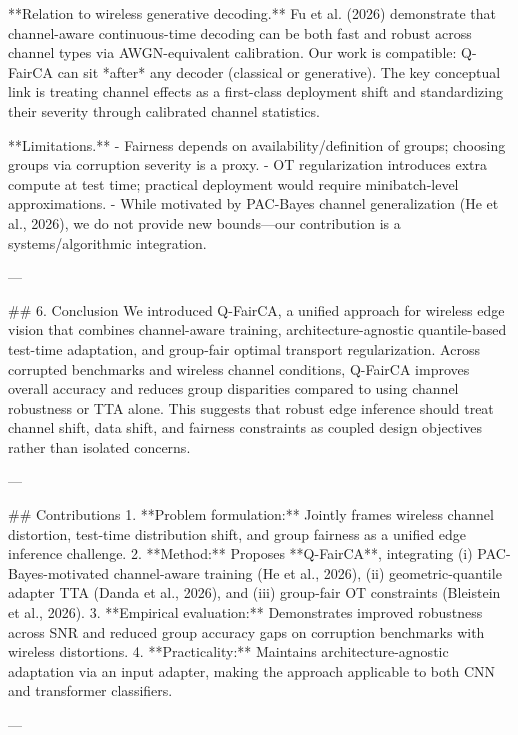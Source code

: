 **Relation to wireless generative decoding.** Fu et al. (2026) demonstrate that channel-aware continuous-time decoding can be both fast and robust across channel types via AWGN-equivalent calibration. Our work is compatible: Q-FairCA can sit *after* any decoder (classical or generative). The key conceptual link is treating channel effects as a first-class deployment shift and standardizing their severity through calibrated channel statistics.

**Limitations.**  
- Fairness depends on availability/definition of groups; choosing groups via corruption severity is a proxy.  
- OT regularization introduces extra compute at test time; practical deployment would require minibatch-level approximations.  
- While motivated by PAC-Bayes channel generalization (He et al., 2026), we do not provide new bounds—our contribution is a systems/algorithmic integration.

---

## 6. Conclusion  
We introduced Q-FairCA, a unified approach for wireless edge vision that combines channel-aware training, architecture-agnostic quantile-based test-time adaptation, and group-fair optimal transport regularization. Across corrupted benchmarks and wireless channel conditions, Q-FairCA improves overall accuracy and reduces group disparities compared to using channel robustness or TTA alone. This suggests that robust edge inference should treat channel shift, data shift, and fairness constraints as coupled design objectives rather than isolated concerns.

---

## Contributions  
1. **Problem formulation:** Jointly frames wireless channel distortion, test-time distribution shift, and group fairness as a unified edge inference challenge.  
2. **Method:** Proposes **Q-FairCA**, integrating (i) PAC-Bayes-motivated channel-aware training (He et al., 2026), (ii) geometric-quantile adapter TTA (Danda et al., 2026), and (iii) group-fair OT constraints (Bleistein et al., 2026).  
3. **Empirical evaluation:** Demonstrates improved robustness across SNR and reduced group accuracy gaps on corruption benchmarks with wireless distortions.  
4. **Practicality:** Maintains architecture-agnostic adaptation via an input adapter, making the approach applicable to both CNN and transformer classifiers.

---